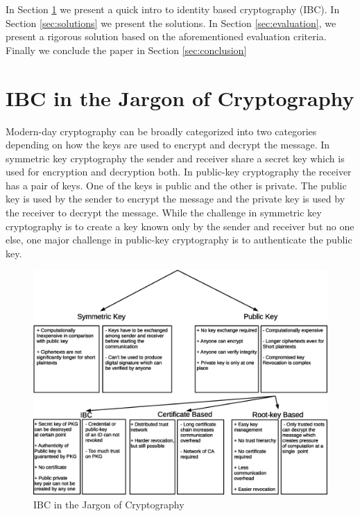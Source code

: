 \documentclass[lnicst,sechang,a4paper]{svmultln}
\begin{document}
In Section \ref{sec:id_based_crypto} we present a quick intro to identity based cryptography (IBC). In Section \ref{sec:solutions} we present the solutions. In Section \ref{sec:evaluation}, we present a rigorous solution based on the aforementioned evaluation criteria. Finally we conclude the paper in Section \ref{sec:conclusion}

\section{IBC in the Jargon of Cryptography} \label{sec:id_based_crypto}
Modern-day cryptography can be broadly categorized into two categories depending on how the keys are used to encrypt and decrypt the message. In symmetric key cryptography the sender and receiver share a secret key which is used for encryption and decryption both. In public-key cryptography the receiver has a pair of keys. One of the keys is public and the other is private. The public key is used by the sender to encrypt the message and the private key is used by the receiver to decrypt the message. While the challenge in symmetric key cryptography is to create a key known only by the sender and receiver but no one else, one major challenge in public-key cryptography is to authenticate the public key.

\begin{figure}
\begin{center}
  \includegraphics[width=.98\textwidth]{ibc_in_jargon_of_crypto.eps}
\caption{IBC in the Jargon of Cryptography}
\label{fig:ibc_in_the_jargon_of_cryptography}       %
\end{center}
\end{figure}
\end{document}
